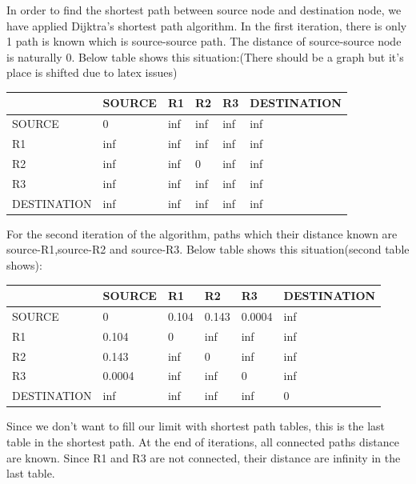 \documentclass[conference]{IEEEtran}
\begin{document}
In order to find the shortest path between source node and destination node, we have applied Dijktra's shortest path algorithm. In the first iteration, there is only 1 path is known which is source-source path. The distance of source-source node is naturally 0. Below table shows this situation:(There should be a graph but it's place is shifted due to latex issues)

\begin{table}[h]
\begin{tabular}{|l|l|l|l|l|l|}
\hline
       & SOURCE  & R1 & R2 & R3 & DESTINATION \\ \hline
SOURCE &   0      &  inf  & inf   & inf  & inf       \\ \hline
R1 &    inf     & inf   & inf   & inf   & inf       \\ \hline
R2 &    inf    & inf   &  0  & inf    & inf      \\ \hline
R3 &    inf     & inf   & inf   & inf   &    inf  \\ \hline
DESTINATION &   inf     &  inf  & inf   & inf   & inf     \\ \hline

\end{tabular}
\end{table}

For the second iteration of the algorithm, paths which their distance known are source-R1,source-R2 and source-R3. Below table shows this situation(second table shows):\\ 

\begin{table}[h]
\begin{tabular}{|l|l|l|l|l|l|}
\hline
       & SOURCE  & R1 & R2 & R3 & DESTINATION \\ \hline
SOURCE &   0      &  0.104  & 0.143   &  0.0004  & inf       \\ \hline
R1 &    0.104     & 0   & inf   & inf   & inf       \\ \hline
R2 &    0.143    & inf   &  0  & inf    & inf      \\ \hline
R3 &    0.0004     & inf   & inf   & 0   &    inf  \\ \hline
DESTINATION &   inf     &  inf  & inf   & inf   & 0     \\ \hline

\end{tabular}
\end{table}

Since we don't want to fill our limit with shortest path tables, this is the last table in the shortest path. At the end of iterations, all connected paths distance are known. Since R1 and R3 are not connected, their distance are infinity in the last table.
\end{document}
